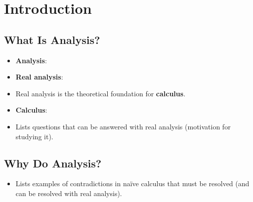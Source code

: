 \documentclass[../main.tex]{subfiles}
\begin{document}
\chapter{Introduction}
\section{What Is Analysis?}
\begin{itemize}
    \item {}\textbf{Analysis}: 
    \item \textbf{Real analysis}: 
    \item Real analysis is the theoretical foundation for \textbf{calculus}.
    \item \textbf{Calculus}: 
    \item Lists questions that can be answered with real analysis (motivation for studying it).
\end{itemize}



\section{Why Do Analysis?}
\begin{itemize}
    \item Lists examples of contradictions in na\"{i}ve calculus that must be resolved (and can be resolved with real analysis).
\end{itemize}
\end{document}
